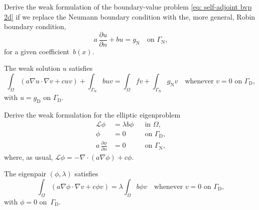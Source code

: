 \begin{Exercises}

\exercise
Derive the weak formulation of the boundary-value 
problem \eqref{eq: self-adjoint bvp 2d} if we replace the Neumann boundary
condition with the, more general, Robin boundary condition,
\[
a\,\frac{\partial u}{\partial n}+bu=g_{\mathrm{N}}
\quad\text{on $\Gamma_{\mathrm{N}}$,}
\]
for a given coefficient~$b(x)$.
\begin{ans}
The weak solution $u$ satisfies
\[
\int_\Omega(a\nabla u\cdot\nabla v+cuv)+\int_{\Gamma_{\mathrm{N}}}buv
=\int_\Omega fv+\int_{\Gamma_{\mathrm{N}}}g_{\mathrm{N}} v 
\quad\text{whenever $v=0$ on~$\Gamma_{\mathrm{D}}$,}
\]
with $u=g_{\mathrm{D}}$ on $\Gamma_{\mathrm{D}}$.
\end{ans}

\exercise
Derive the weak formulation for the elliptic eigenproblem
\[
\begin{aligned}
\mathcal{L}\phi&=\lambda b\phi&&\text{in $\Omega$},\\
\phi&=0&&\text{on $\Gamma_{\mathrm{D}}$,}\\
a\,\frac{\partial\phi}{\partial n}&=0&&\text{on $\Gamma_{\mathrm{N}}$,}
\end{aligned}
\]
where, as usual, $\mathcal{L}\phi=-\nabla\cdot(a\nabla\phi)+c\phi$.
\begin{ans}
The eigenpair $(\phi,\lambda)$ satisfies
\[
\int_\Omega(a\nabla\phi\cdot\nabla v+c\phi v)=\lambda\int_\Omega b\phi v
\quad\text{whenever $v=0$ on $\Gamma_{\mathrm{D}}$,}
\]
with $\phi=0$ on~$\Gamma_{\mathrm{D}}$.
\end{ans}


\end{Exercises}
